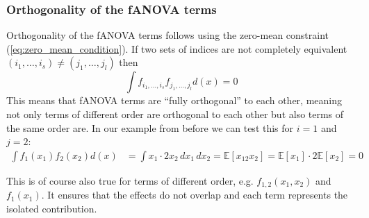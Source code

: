 \subsubsection*{Orthogonality of the fANOVA terms}
Orthogonality of the fANOVA terms follows using the zero-mean constraint (\autoref{eq:zero_mean_condition}). If two sets of indices are not completely equivalent $(i_1, \dots, i_s) \neq (j_1, \dots, j_l)$ then
\begin{equation}
    \int f_{i_{1}, \dots, i_{s}} f_{j_{1}, \dots, j_{l}} d(x) = 0
    \label{eq:orthogonality}
\end{equation}
This means that fANOVA terms are ``fully orthogonal'' to each other, meaning not only terms of different order are orthogonal to each other but also terms of the same order are.
In our example from before we can test this for $i = 1$ and $j = 2$:
\begin{align*}
    \int f_{1}(x_1) f_{2}(x_2) d(x) &= \int x_1 \cdot 2x_2 \, dx_1 \, dx_2 = \mathbb{E}[x_12x_2] = \mathbb{E}[x_1] \cdot 2\mathbb{E}[x_2] = 0
\end{align*}

This is of course also true for terms of different order, e.g. \( f_{1,2}(x_1, x_2) \) and \( f_{1}(x_1) \). It ensures that the effects do not overlap and each term represents the isolated contribution.

